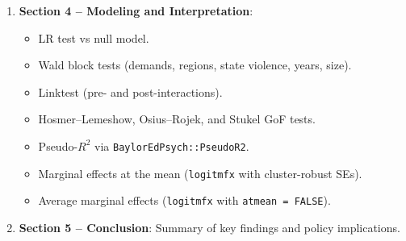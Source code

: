\documentclass[12pt,a4paper]{article}
\begin{document}
\begin{enumerate}
  \item \textbf{Section 4 -- Modeling and Interpretation}:
  \begin{itemize}
    \item LR test vs null model.
    \item Wald block tests (demands, regions, state violence, years, size).
    \item Linktest (pre- and post-interactions).
    \item Hosmer--Lemeshow, Osius--Rojek, and Stukel GoF tests.
    \item Pseudo-$R^2$ via \texttt{BaylorEdPsych::PseudoR2}.
    \item Marginal effects at the mean (\texttt{logitmfx} with cluster-robust SEs).
    \item Average marginal effects (\texttt{logitmfx} with \texttt{atmean = FALSE}).
  \end{itemize}

  \item \textbf{Section 5 -- Conclusion}: Summary of key findings and policy implications.
\end{enumerate}
\end{document}
